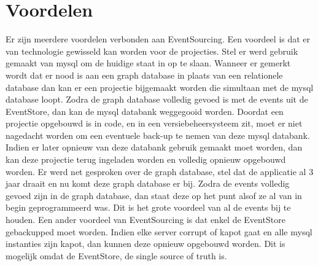 
\chapter{Voordelen}
\label{ch:voordelen}

Er zijn meerdere voordelen verbonden aan EventSourcing. Een voordeel is dat er van technologie gewisseld kan worden voor de projecties. Stel er werd gebruik gemaakt van \gls{mysql} om de huidige staat in op te slaan. Wanneer er gemerkt wordt dat er nood is aan een graph database in plaats van een relationele database dan kan er een projectie bijgemaakt worden die simultaan met de \gls{mysql} database loopt. Zodra de graph database volledig gevoed is met de events uit de EventStore, dan kan de \gls{mysql} databank weggegooid worden. Doordat een projectie opgebouwd is in code, en in een versiebeheersysteem zit, moet er niet nagedacht worden om een eventuele back-up te nemen van deze \gls{mysql} databank. Indien er later opnieuw van deze databank gebruik gemaakt moet worden, dan kan deze projectie terug ingeladen worden en volledig opnieuw opgebouwd worden.
Er werd net gesproken over de graph database, stel dat de applicatie al 3 jaar draait en nu komt deze graph database er bij. Zodra de events volledig gevoed zijn in de graph database, dan staat deze op het punt alsof ze al van in begin geprogrammeerd was. Dit is het grote voordeel van al de events bij te houden.
Een ander voordeel van EventSourcing is dat enkel de EventStore gebackupped moet worden. Indien elke server corrupt of kapot gaat en alle \gls{mysql} instanties zijn kapot, dan kunnen deze opnieuw opgebouwd worden. Dit is mogelijk omdat de EventStore, de single source of truth is.